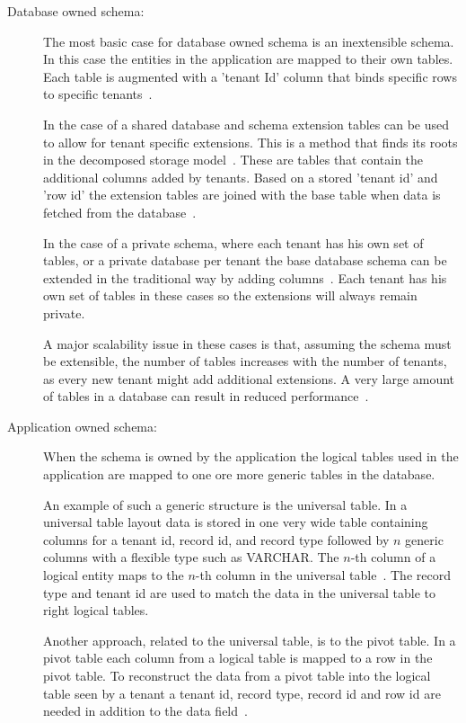 \begin{description}
	\item[Database owned schema: ] The most basic case for database owned schema is an inextensible schema.
		In this case the entities in the application are mapped to their own tables.
		Each table is augmented with a 'tenant Id' column that binds specific rows to specific tenants~\cite{aulbach2008multi}.

		In the case of a shared database and schema extension tables can be used to allow for tenant specific extensions.
		This is a method that finds its roots in the decomposed storage model~\cite{copeland1985decomposition}.
		These are tables that contain the additional columns added by tenants. 
		Based on a stored 'tenant id' and 'row id' the extension tables are joined with the base table when data is fetched from the database~\cite{aulbach2008multi}.

		In the case of a private schema, where each tenant has his own set of tables, or a private database per tenant the base database schema can be extended in the traditional way by adding columns~\cite{aulbach2009comparison}.
		Each tenant has his own set of tables in these cases so the extensions will always remain private. 
	
		A major scalability issue in these cases is that, assuming the schema must be extensible, the number of tables increases with the number of tenants, as every new tenant might add additional extensions.
		A very large amount of tables in a database can result in reduced performance~\cite{aulbach2008multi}.
	\item[Application owned schema: ] When the schema is owned by the application the logical tables used in the application are mapped to one ore more generic tables in the database.
		
		An example of such a generic structure is the universal table. 
		In a universal table layout data is stored in one very wide table containing columns for a tenant id, record id, and record type followed by $n$ generic columns with a flexible type such as VARCHAR.
		The $n$-th column of a logical entity maps to the $n$-th column in the universal table~\cite{aulbach2008multi}. The record type and tenant id are used to match the data in the universal table to right logical tables.

		Another approach, related to the universal table, is to the pivot table. 
		In a pivot table each column from a logical table is mapped to a row in the pivot table.
		To reconstruct the data from a pivot table into the logical table seen by a tenant a tenant id, record type, record id and row id are needed in addition to the data field~\cite{aulbach2008multi}.


\end{description}
